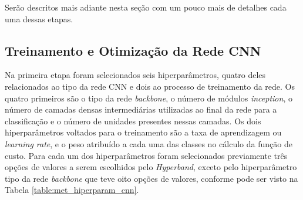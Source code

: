 Serão descritos mais adiante nesta seção com um pouco mais de detalhes cada uma dessas etapas.

\subsection{Treinamento e Otimização da Rede CNN}\label{subsec:cap_metodo_treinamento_cnn}

Na primeira etapa foram selecionados seis hiperparâmetros, quatro deles relacionados ao tipo da rede CNN e dois ao processo de treinamento da rede. Os quatro primeiros são o tipo da rede \textit{backbone}, o número de módulos \textit{inception}, o número de camadas densas intermediárias utilizadas ao final da rede para a classificação e o número de unidades presentes nessas camadas. Os dois hiperparâmetros voltados para o treinamento são a taxa de aprendizagem ou \textit{learning rate}, e o peso atribuído a cada uma das classes no cálculo da função de custo. Para cada um dos hiperparâmetros foram selecionados previamente três opções de valores a serem escolhidos pelo \textit{Hyperband}, exceto pelo hiperparâmetro tipo da rede \textit{backbone} que teve oito opções de valores, conforme pode ser visto na Tabela \ref{table:met_hiperparam_cnn}.

